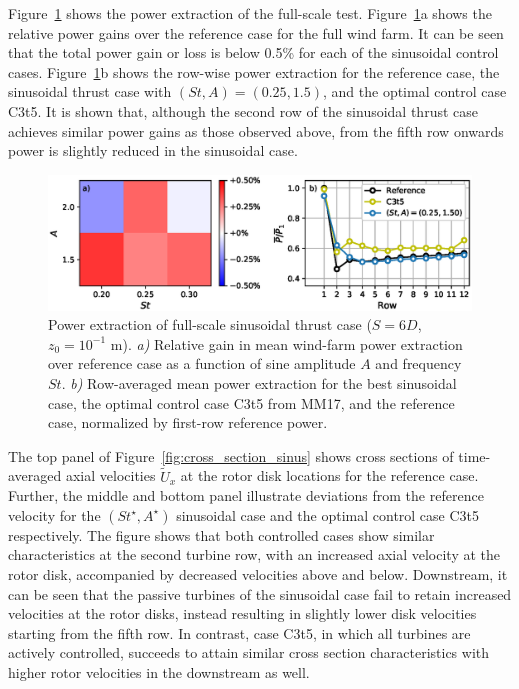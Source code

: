 \documentclass[wes, manuscript]{copernicus}
\begin{document}
Figure~\ref{fig:sinus_fullscale} shows the power extraction of the full-scale test. Figure~\ref{fig:sinus_fullscale}a shows the relative power gains over the reference case for the full wind farm. It can be seen that the total power gain or loss is below 0.5\% for each of the sinusoidal control cases. Figure~\ref{fig:sinus_fullscale}b shows the row-wise power extraction for the reference case, the sinusoidal thrust case with $(St, A) = (0.25, 1.5)$, and the optimal control case C3t5. It is shown that, although the second row of the sinusoidal thrust case achieves similar power gains as those observed above, from the fifth row onwards power is slightly reduced in the sinusoidal case.

\begin{figure}
	\centering
	\includegraphics[width=\textwidth]{gains_fullscale.eps}
	\caption{Power extraction of full-scale sinusoidal thrust case ($S = 6D$, $z_0 = 10^{-1}$ m). \emph{a) } Relative gain in mean wind-farm power extraction over reference case as a function of sine amplitude $A$ and frequency $St$. \emph{b) } Row-averaged mean power extraction for the best sinusoidal case, the optimal control case C3t5 from MM17, and the reference case, normalized by first-row reference power.\label{fig:sinus_fullscale} }
\end{figure}

The top panel of Figure~\ref{fig:cross_section_sinus} shows cross sections of time-averaged axial velocities $\widetilde{U}_x$ at the rotor disk locations for the reference case. Further, the middle and bottom panel illustrate deviations from the reference velocity for the $(St^\star, A^\star)$ sinusoidal case and the optimal control case C3t5 respectively.  The figure shows that both controlled cases show similar characteristics at the second turbine row, with an increased axial velocity at the rotor disk, accompanied by decreased velocities above and below. Downstream, it can be seen that the passive turbines of the sinusoidal case fail to retain increased velocities at the rotor disks, instead resulting in slightly lower disk velocities starting from the fifth row. In contrast, case C3t5, in which all turbines are actively controlled, succeeds to attain similar cross section characteristics with higher rotor velocities in the downstream as well. 
\end{document}
